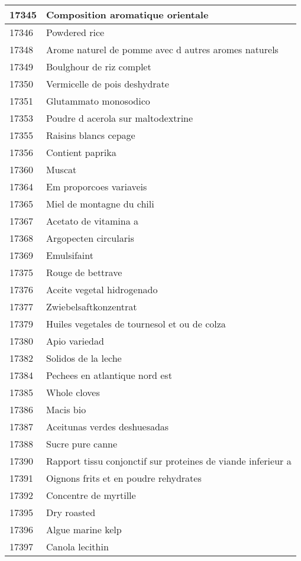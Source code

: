 \begin{longtable}{|l|l|}
17345 & Composition aromatique orientale \\ \hline 
17346 & Powdered rice \\ \hline 
17348 & Arome naturel de pomme avec d autres aromes naturels \\ \hline 
17349 & Boulghour de riz complet \\ \hline 
17350 & Vermicelle de pois deshydrate \\ \hline 
17351 & Glutammato monosodico \\ \hline 
17353 & Poudre d acerola sur maltodextrine \\ \hline 
17355 & Raisins blancs cepage \\ \hline 
17356 & Contient paprika \\ \hline 
17360 & Muscat \\ \hline 
17364 & Em proporcoes variaveis \\ \hline 
17365 & Miel de montagne du chili \\ \hline 
17367 & Acetato de vitamina a \\ \hline 
17368 & Argopecten circularis \\ \hline 
17369 & Emulsifaint \\ \hline 
17375 & Rouge de bettrave \\ \hline 
17376 & Aceite vegetal hidrogenado \\ \hline 
17377 & Zwiebelsaftkonzentrat \\ \hline 
17379 & Huiles vegetales de tournesol et ou de colza \\ \hline 
17380 & Apio variedad \\ \hline 
17382 & Solidos de la leche \\ \hline 
17384 & Pechees en atlantique nord est \\ \hline 
17385 & Whole cloves \\ \hline 
17386 & Macis bio \\ \hline 
17387 & Aceitunas verdes deshuesadas \\ \hline 
17388 & Sucre pure canne \\ \hline 
17390 & Rapport tissu conjonctif sur proteines de viande inferieur a \\ \hline 
17391 & Oignons frits et en poudre rehydrates \\ \hline 
17392 & Concentre de myrtille \\ \hline 
17395 & Dry roasted \\ \hline 
17396 & Algue marine kelp \\ \hline 
17397 & Canola lecithin \\ \hline 

\end{longtable}

